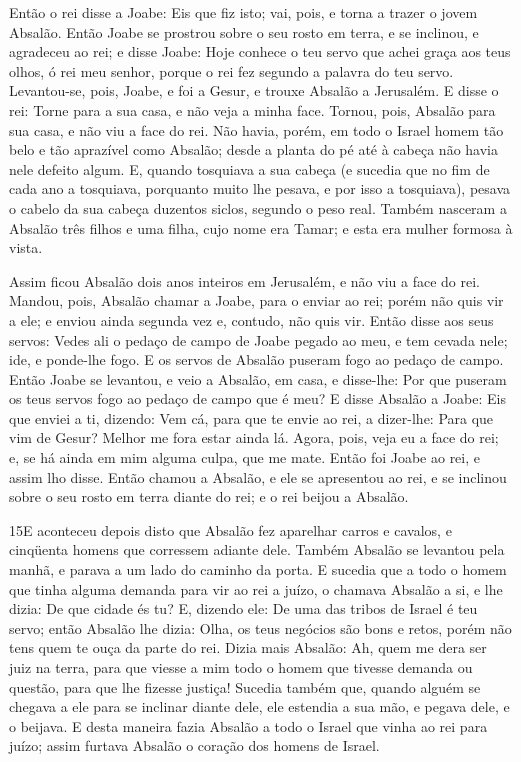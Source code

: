 Então o rei disse a Joabe: Eis que fiz isto; vai, pois, e torna a
trazer o jovem Absalão. Então Joabe se prostrou sobre o seu
rosto em terra, e se inclinou, e agradeceu ao rei; e disse Joabe:
Hoje conhece o teu servo que achei graça aos teus olhos, ó rei meu
senhor, porque o rei fez segundo a palavra do teu servo.
Levantou-se, pois, Joabe, e foi a Gesur, e trouxe Absalão a
Jerusalém. E disse o rei: Torne para a sua casa, e não veja a
minha face. Tornou, pois, Absalão para sua casa, e não viu a face do
rei. Não havia, porém, em todo o Israel homem tão belo e tão
aprazível como Absalão; desde a planta do pé até à cabeça não havia
nele defeito algum. E, quando tosquiava a sua cabeça (e
sucedia que no fim de cada ano a tosquiava, porquanto muito lhe
pesava, e por isso a tosquiava), pesava o cabelo da sua cabeça
duzentos siclos, segundo o peso real. Também nasceram a
Absalão três filhos e uma filha, cujo nome era Tamar; e esta era
mulher formosa à vista.

Assim ficou Absalão dois anos inteiros em Jerusalém, e não viu a
face do rei. Mandou, pois, Absalão chamar a Joabe, para o
enviar ao rei; porém não quis vir a ele; e enviou ainda segunda vez
e, contudo, não quis vir. Então disse aos seus servos: Vedes
ali o pedaço de campo de Joabe pegado ao meu, e tem cevada nele;
ide, e ponde-lhe fogo. E os servos de Absalão puseram fogo ao pedaço
de campo. Então Joabe se levantou, e veio a Absalão, em casa,
e disse-lhe: Por que puseram os teus servos fogo ao pedaço de campo
que é meu? E disse Absalão a Joabe: Eis que enviei a ti,
dizendo: Vem cá, para que te envie ao rei, a dizer-lhe: Para que vim
de Gesur? Melhor me fora estar ainda lá. Agora, pois, veja eu a face
do rei; e, se há ainda em mim alguma culpa, que me mate.
Então foi Joabe ao rei, e assim lho disse. Então chamou a
Absalão, e ele se apresentou ao rei, e se inclinou sobre o seu rosto
em terra diante do rei; e o rei beijou a Absalão.

\medskip

\lettrine{15} E aconteceu depois disto que Absalão fez
aparelhar carros e cavalos, e cinqüenta homens que corressem adiante
dele. Também Absalão se levantou pela manhã, e parava a um lado
do caminho da porta. E sucedia que a todo o homem que tinha alguma
demanda para vir ao rei a juízo, o chamava Absalão a si, e lhe
dizia: De que cidade és tu? E, dizendo ele: De uma das tribos de
Israel é teu servo; então Absalão lhe dizia: Olha, os teus
negócios são bons e retos, porém não tens quem te ouça da parte do
rei. Dizia mais Absalão: Ah, quem me dera ser juiz na terra,
para que viesse a mim todo o homem que tivesse demanda ou questão,
para que lhe fizesse justiça! Sucedia também que, quando alguém
se chegava a ele para se inclinar diante dele, ele estendia a sua
mão, e pegava dele, e o beijava. E desta maneira fazia Absalão a
todo o Israel que vinha ao rei para juízo; assim furtava Absalão o
coração dos homens de Israel.

